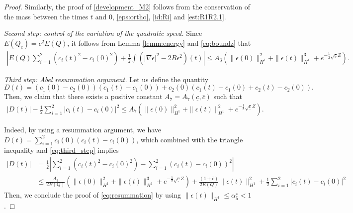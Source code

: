 \documentclass[10pt,a4paper]{amsart}
\begin{document}
\begin{proof}
        Similarly, the proof of \eqref{development_M2} follows from the conservation of the mass between the times $t$ and $0$, \eqref{eps:ortho}, \eqref{id:Ri} and \eqref{est:R1R2.1}. 

\medskip
\noindent \textit{Second step: control of the variation of the quadratic speed.}
 	Since $E(Q_c) = c^2 E(Q)$, it follows from Lemma \ref{lemm:energy} and \eqref{eq:boundz} that 
		\begin{align}\label{eq:third_step}
			\left\vert E(Q) \sum_{i=1}^2 \left( c_i(t)^2 - c_i(0)^2 \right) + \frac12 \int \left( \vert \nabla \epsilon \vert^2 - 2 R \epsilon^2 \right)(t) \right\vert \leq A_3 \left( \| \epsilon (0) \|_{H^1}^2 + \| \epsilon (t) \|_{H^1}^3 + e^{- \frac12 \sqrt{\underline{c}}Z} \right).
		\end{align}


\medskip
\noindent	\textit{Third step: Abel resummation argument.} Let us define the quantity
\begin{equation} \label{defi:D}
D(t)=(c_1(0) - c_2(0)) \left( c_1(t) - c_1(0) \right) + c_2(0) \left( c_1(t) -c_1(0) + c_2(t) - c_2(0)  \right).
\end{equation}
Then, we claim that there exists a positive constant $A_7=A_7(\underline{c}, \bar{c})$ such that
\begin{align}
	\left\vert D(t)  \right\vert - \frac12 \sum_{i=1}^2 \vert c_i(t) - c_i(0) \vert^2 \le A_7 \left( \| \epsilon(0) \|_{H^1}^2 +\| \epsilon (t) \|_{H^1}^2 + e^{-\frac18 \sqrt{\underline{c} }Z} \right) .\label{eq:resummation}
\end{align}

Indeed, by using a resummation argument, we have
			$D(t)=\sum_{i=1}^2 c_i(0) \left( c_i(t) -c_i(0) \right)$,
which combined with the triangle inequality and \eqref{eq:third_step} implies
\begin{align}
	\left\vert D(t) \right\vert
	& = \frac12 \left\vert \sum_{i=1}^2 \left( c_i(t)^2 - c_i(0)^2 \right) -\sum_{i=1}^2(c_i(t) -c_i(0))^2 \right\vert \label{eq:Abel}\\
	& \leq \frac{A_3}{2 E(Q)} \left( \| \epsilon (0) \|_{H^1}^2 + \| \epsilon(t) \|_{H^1}^3 + e^{-\frac12 \sqrt{\underline{c}} Z}\right) +\frac{(1+\bar{c})}{2E(Q)} \| \epsilon (t) \|_{H^1}^2 + \frac12 \sum_{i=1}^2 \vert c_i(t) - c_i(0) \vert^2 \nonumber
\end{align}
Then, we conclude the proof of \eqref{eq:resummation} by using $\| \epsilon (t) \|_{H^1} \leq \alpha_5^\star<1$.


\end{proof}
\end{document}
